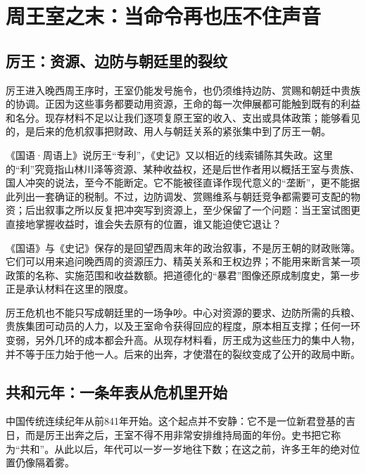 \section{周王室之末：当命令再也压不住声音}

\subsection{厉王：资源、边防与朝廷里的裂纹}

厉王进入晚西周王序时，王室仍能发号施令，也仍须维持边防、赏赐和朝廷中贵族的协调。正因为这些事务都要动用资源，王命的每一次伸展都可能触到既有的利益和名分。现存材料不足以让我们逐项复原王室的收入、支出或具体政策；能够看见的，是后来的危机叙事把财政、用人与朝廷关系的紧张集中到了厉王一朝。

《国语·周语上》说厉王“专利”，《史记》又以相近的线索铺陈其失政。这里的“利”究竟指山林川泽等资源、某种收益权，还是后世作者用以概括王室与贵族、国人冲突的说法，至今不能断定。它不能被径直译作现代意义的“垄断”，更不能据此列出一套确证的税制。不过，边防调发、赏赐维系与朝廷竞争都需要可支配的物资；后出叙事之所以反复把冲突写到资源上，至少保留了一个问题：当王室试图更直接地掌握收益时，谁会失去原有的位置，谁又能迫使它退让？

\begin{debate}[“专利”能说明什么]
《国语》与《史记》保存的是回望西周末年的政治叙事，不是厉王朝的财政账簿。它们可以用来追问晚西周的资源压力、精英关系和王权边界；不能用来断言某一项政策的名称、实施范围和收益数额。把道德化的“暴君”图像还原成制度史，第一步正是承认材料在这里的限度。
\end{debate}

厉王危机也不能只写成朝廷里的一场争吵。中心对资源的要求、边防所需的兵粮、贵族集团可动员的人力，以及王室命令获得回应的程度，原本相互支撑；任何一环变弱，另外几环的成本都会升高。从现存材料看，厉王成为这些压力的集中人物，并不等于压力始于他一人。后来的出奔，才使潜在的裂纹变成了公开的政局中断。

\subsection{共和元年：一条年表从危机里开始}


中国传统连续纪年从前841年开始。这个起点并不安静：它不是一位新君登基的吉日，而是厉王出奔之后，王室不得不用非常安排维持局面的年份。史书把它称为“共和”。从此以后，年代可以一岁一岁地往下数；在这之前，许多王年的绝对位置仍像隔着雾。

